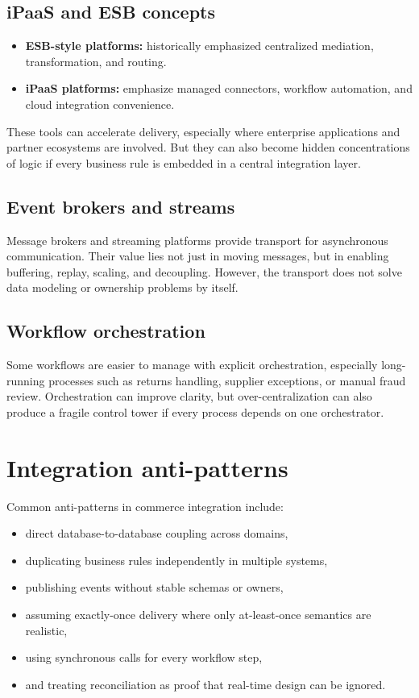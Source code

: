 \subsection{iPaaS and ESB concepts}
\begin{itemize}
  \item \textbf{ESB-style platforms:} historically emphasized centralized mediation, transformation, and routing.
  \item \textbf{iPaaS platforms:} emphasize managed connectors, workflow automation, and cloud integration convenience.
\end{itemize}

These tools can accelerate delivery, especially where enterprise applications and partner ecosystems are involved.
But they can also become hidden concentrations of logic if every business rule is embedded in a central integration layer.

\subsection{Event brokers and streams}
Message brokers and streaming platforms provide transport for asynchronous communication.
Their value lies not just in moving messages, but in enabling buffering, replay, scaling, and decoupling.
However, the transport does not solve data modeling or ownership problems by itself.

\subsection{Workflow orchestration}
Some workflows are easier to manage with explicit orchestration, especially long-running processes such as returns handling, supplier exceptions, or manual fraud review.
Orchestration can improve clarity, but over-centralization can also produce a fragile control tower if every process depends on one orchestrator.

\section{Integration anti-patterns}
Common anti-patterns in commerce integration include:
\begin{itemize}
  \item direct database-to-database coupling across domains,
  \item duplicating business rules independently in multiple systems,
  \item publishing events without stable schemas or owners,
  \item assuming exactly-once delivery where only at-least-once semantics are realistic,
  \item using synchronous calls for every workflow step,
  \item and treating reconciliation as proof that real-time design can be ignored.
\end{itemize}


